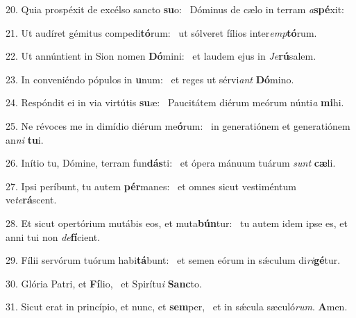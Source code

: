 20. Quia prospéxit de excélso sancto \textbf{su}o: \ast\  Dóminus de cælo in terram \textit{a}\textbf{spé}xit:\

21. Ut audíret gémitus compedi\textbf{tó}rum: \ast\  ut sólveret fílios inter\textit{emp}\textbf{tó}rum.\

22. Ut annúntient in Sion nomen \textbf{Dó}mini: \ast\  et laudem ejus in \textit{Je}\textbf{rú}salem.\

23. In conveniéndo pópulos in \textbf{u}num: \ast\  et reges ut sérvi\textit{ant} \textbf{Dó}mino.\

24. Respóndit ei in via virtútis \textbf{su}æ: \ast\  Paucitátem diérum meórum núnti\textit{a} \textbf{mi}hi.\

25. Ne révoces me in dimídio diérum me\textbf{ó}rum: \ast\  in generatiónem et generatiónem an\textit{ni} \textbf{tu}i.\

26. Inítio tu, Dómine, terram fun\textbf{dás}ti: \ast\  et ópera mánuum tuárum \textit{sunt} \textbf{cæ}li.\

27. Ipsi períbunt, tu autem \textbf{pér}manes: \ast\  et omnes sicut vestiméntum ve\textit{te}\textbf{rá}scent.\

28. Et sicut opertórium mutábis eos, et muta\textbf{bún}tur: \ast\  tu autem idem ipse es, et anni tui non \textit{de}\textbf{fí}cient.\

29. Fílii servórum tuórum habi\textbf{tá}bunt: \ast\  et semen eórum in sǽculum di\textit{ri}\textbf{gé}tur.\

30. Glória Patri, et \textbf{Fí}lio, \ast\  et Spirítu\textit{i} \textbf{Sanc}to.\

31. Sicut erat in princípio, et nunc, et \textbf{sem}per, \ast\  et in sǽcula sæculó\textit{rum}. \textbf{A}men.\

